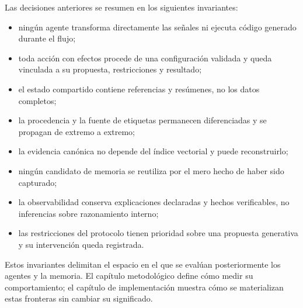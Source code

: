 Las decisiones anteriores se resumen en los siguientes invariantes:

\begin{itemize}
  \item ningún agente transforma directamente las señales ni ejecuta código
        generado durante el flujo;
  \item toda acción con efectos procede de una configuración validada y queda
        vinculada a su propuesta, restricciones y resultado;
  \item el estado compartido contiene referencias y resúmenes, no los datos
        completos;
  \item la procedencia y la fuente de etiquetas permanecen diferenciadas y se
        propagan de extremo a extremo;
  \item la evidencia canónica no depende del índice vectorial y puede
        reconstruirlo;
  \item ningún candidato de memoria se reutiliza por el mero hecho de haber
        sido capturado;
  \item la observabilidad conserva explicaciones declaradas y hechos
        verificables, no inferencias sobre razonamiento interno;
  \item las restricciones del protocolo tienen prioridad sobre una propuesta
        generativa y su intervención queda registrada.
\end{itemize}

Estos invariantes delimitan el espacio en el que se evalúan posteriormente los
agentes y la memoria. El capítulo metodológico define cómo medir su
comportamiento; el capítulo de implementación muestra cómo se materializan
estas fronteras sin cambiar su significado.
